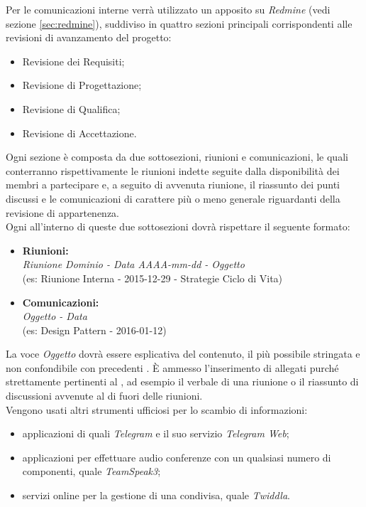 \documentclass{scalatekids-article}
\begin{document}
\label{sec:ComunicazioniInterne}
Per le comunicazioni interne verrà utilizzato un  apposito su
\textit{Redmine} (vedi sezione \ref{sec:redmine}), suddiviso in quattro sezioni
principali corrispondenti alle revisioni di avanzamento del progetto:
\begin{itemize}
    \item Revisione dei Requisiti;
    \item Revisione di Progettazione;
    \item Revisione di Qualifica;
    \item Revisione di Accettazione.
\end{itemize}
Ogni sezione è composta da due sottosezioni, riunioni e comunicazioni, le quali
conterranno rispettivamente le riunioni indette seguite dalla disponibilità dei
membri a partecipare e, a seguito di avvenuta riunione, il riassunto dei punti
discussi e le comunicazioni di carattere più o meno generale riguardanti
 della revisione di appartenenza.\\ Ogni  all'interno di
queste due sottosezioni dovrà rispettare il seguente formato:
\begin{itemize}
    \item\textbf{Riunioni:}\\
        \textit{Riunione Dominio - Data AAAA-mm-dd - Oggetto}\\
        (es: Riunione Interna - 2015-12-29 - Strategie Ciclo di Vita)
    \item\textbf{Comunicazioni:}\\
        \textit{Oggetto - Data}\\
        (es: Design Pattern - 2016-01-12)
\end{itemize}
La voce \textit{Oggetto} dovrà essere esplicativa del contenuto, il più
possibile stringata e non confondibile con precedenti . È ammesso
l'inserimento di allegati purché strettamente pertinenti al , ad
esempio il verbale di una riunione o il riassunto di discussioni avvenute al di
fuori delle riunioni.\\ Vengono usati altri strumenti ufficiosi per lo scambio
di informazioni:
\begin{itemize}
    \item applicazioni di  quali \textit{Telegram} e il suo servizio \textit{Telegram Web};
    \item applicazioni  per effettuare audio conferenze con un qualsiasi numero di componenti, quale \textit{TeamSpeak3};
    \item servizi online per la gestione di una  condivisa, quale \textit{Twiddla}.
\end{itemize}
\end{document}
